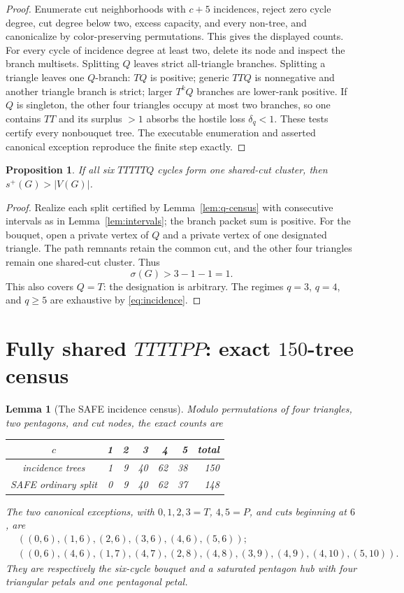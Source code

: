 \documentclass[11pt]{article}
\newtheorem{lemma}[theorem]{Lemma}
\newtheorem{proposition}[theorem]{Proposition}
\newcommand{\spE}{s^+}
\newcommand{\sig}{\sigma}
\begin{document}
\begin{proof}
Enumerate cut neighborhoods with $c+5$ incidences, reject zero cycle degree,
cut degree below two, excess capacity, and every non-tree, and canonicalize by
color-preserving permutations.  This gives the displayed counts.  For every
cycle of incidence degree at least two, delete its node and inspect the branch
multisets.  Splitting $Q$ leaves strict all-triangle branches.  Splitting a
triangle leaves one $Q$-branch: $TQ$ is positive; generic $TTQ$ is nonnegative
and another triangle branch is strict; larger $T^kQ$ branches are lower-rank
positive.  If $Q$ is singleton, the other four triangles occupy at most two
branches, so one contains $TT$ and its surplus $>1$ absorbs the hostile loss
$\delta_q<1$.  These tests certify every nonbouquet tree.  The executable
enumeration and asserted canonical exception reproduce the finite step exactly.
\end{proof}

\begin{proposition}\label{prop:shared-tttttq}
If all six $TTTTTQ$ cycles form one shared-cut cluster, then
$\spE(G)>|V(G)|$.
\end{proposition}
\begin{proof}
Realize each split certified by Lemma~\ref{lem:q-census} with consecutive
intervals as in Lemma~\ref{lem:intervals}; the branch packet sum is positive.
For the bouquet, open a private vertex of $Q$ and a private vertex of one
designated triangle.  The path remnants retain the common cut, and the other
four triangles remain one shared-cut cluster.  Thus
\[
 \sig(G)>3-1-1=1.
\]
This also covers $Q=T$: the designation is arbitrary.  The regimes $q=3$,
$q=4$, and $q\geq5$ are exhaustive by \eqref{eq:incidence}.
\end{proof}

\section{Fully shared $TTTTPP$: exact $150$-tree census}

\begin{lemma}[The SAFE incidence census]\label{lem:pp-census}
Modulo permutations of four triangles, two pentagons, and cut nodes, the exact
counts are
\begin{center}
\begin{tabular}{c|rrrrr|r}
$c$&1&2&3&4&5&total\\ \hline
incidence trees&1&9&40&62&38&150\\
SAFE ordinary split&0&9&40&62&37&148
\end{tabular}
\end{center}
The two canonical exceptions, with $0,1,2,3=T$, $4,5=P$, and cuts beginning
at $6$, are
\begin{align}
 &((0,6),(1,6),(2,6),(3,6),(4,6),(5,6));
 \label{eq:pp-bouquet}\\
 &((0,6),(4,6),(1,7),(4,7),(2,8),(4,8),
   (3,9),(4,9),(4,10),(5,10)).
 \label{eq:saturated-hub}
\end{align}
They are respectively the six-cycle bouquet and a saturated pentagon hub with
four triangular petals and one pentagonal petal.
\end{lemma}
\end{document}

